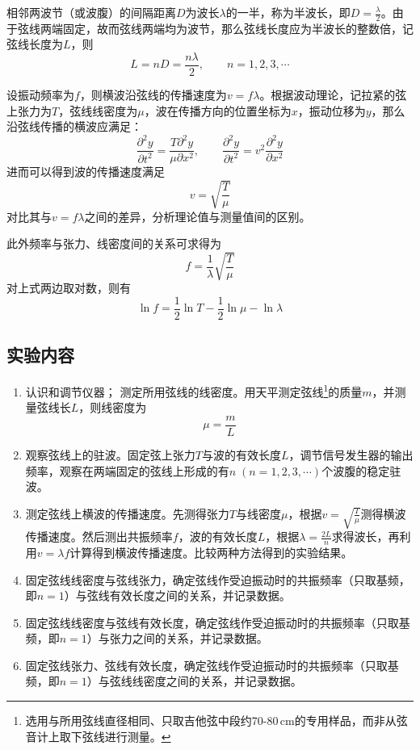 \documentclass[UTF8]{article}
\theoremstyle{MyLineTheoremStyle} %
\theoremstyle{MyBlockTheoremStyle} %
\theoremstyle{MySubsubsectionStyle} %
\begin{document}
相邻两波节（或波腹）的间隔距离$ D $为波长$ \lambda $的一半，称为半波长，即$ D=\frac\lambda2 $。由于弦线两端固定，故而弦线两端均为波节，那么弦线长度应为半波长的整数倍，记弦线长度为$ L $，则
\begin{equation}
L=nD=\frac{n\lambda}{2},\qquad n=1,2,3,\cdots
\end{equation}

设振动频率为$ f $，则横波沿弦线的传播速度为$ v=f\lambda $。根据波动理论，记拉紧的弦上张力为$ T $，弦线线密度为$ \mu $，波在传播方向的位置坐标为$ x $，振动位移为$ y $，那么沿弦线传播的横波应满足：
\begin{equation}
\frac{\partial^2y}{\partial t^2}=\frac{T\partial^2y}{\mu\partial x^2},\qquad\frac{\partial^2y}{\partial t^2}=v^2\frac{\partial^2y}{\partial x^2}
\end{equation}
进而可以得到波的传播速度满足
\begin{equation}
v=\sqrt{\frac T\mu}
\end{equation}
对比其与$ v=f\lambda $之间的差异，分析理论值与测量值间的区别。

此外频率与张力、线密度间的关系可求得为
\begin{equation}
f=\frac1\lambda\sqrt{\frac T\mu}
\end{equation}
对上式两边取对数，则有
\begin{equation}
\ln f=\frac12\ln T-\frac12\ln\mu-\ln\lambda
\end{equation}

\subsection{实验内容}
\begin{enumerate}
\item 认识和调节仪器；
测定所用弦线的线密度。用天平测定弦线\footnote{选用与所用弦线直径相同、只取吉他弦中段约70-80\,cm的专用样品，而非从弦音计上取下弦线进行测量。}的质量$ m $，并测量弦线长$ L $，则线密度为
\begin{equation}
\mu=\frac mL
\end{equation}

\item 观察弦线上的驻波。固定弦上张力$ T $与波的有效长度$ L $，调节信号发生器的输出频率，观察在两端固定的弦线上形成的有$ n\;(n=1,2,3,\cdots) $个波腹的稳定驻波。
\item 测定弦线上横波的传播速度。先测得张力$ T $与线密度$ \mu $，根据$ v=\sqrt{\frac T\mu} $测得横波传播速度。然后测出共振频率$ f $，波的有效长度$ L $，根据$ \lambda=\frac{2L}{n} $求得波长，再利用$ v=\lambda f $计算得到横波传播速度。比较两种方法得到的实验结果。
\item 固定弦线线密度与弦线张力，确定弦线作受迫振动时的共振频率（只取基频，即$ n=1 $）与弦线有效长度之间的关系，并记录数据。
\item 固定弦线线密度与弦线有效长度，确定弦线作受迫振动时的共振频率（只取基频，即$ n=1 $）与张力之间的关系，并记录数据。
\item 固定弦线张力、弦线有效长度，确定弦线作受迫振动时的共振频率（只取基频，即$ n=1 $）与弦线线密度之间的关系，并记录数据。
\end{enumerate}
\end{document}

